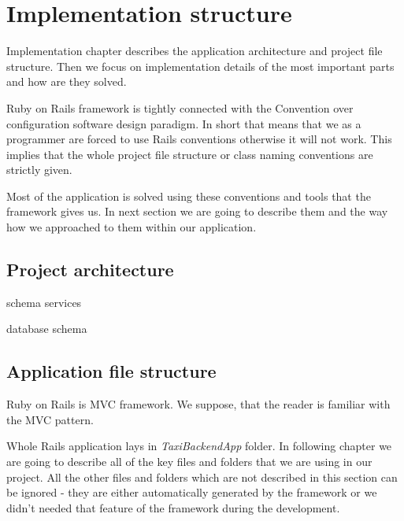 \chapter{Implementation structure}
Implementation chapter describes the application architecture and project file structure. Then we focus on implementation details of the most important parts and how are they solved.

Ruby on Rails framework is tightly connected with the Convention over configuration software design paradigm. In short that means that we as a programmer are forced to use Rails conventions otherwise it will not work. This implies that the whole project file structure or class naming conventions are strictly given. 

Most of the application is solved using these conventions and tools that the framework gives us. In next section we are going to describe them and the way how we approached to them within our application.
\section{Project architecture}
schema services

database schema
\section {Application file structure}
	Ruby on Rails is MVC framework. We suppose, that the reader is familiar with the MVC  pattern.
	
	Whole Rails application lays in \textit{TaxiBackendApp} folder. In following chapter we are going to describe all of the key files and folders that we are using in our project. All the other files and folders which are not described in this section can be ignored - they are either automatically generated by the framework or we didn't needed that feature of the framework during the development.
	
